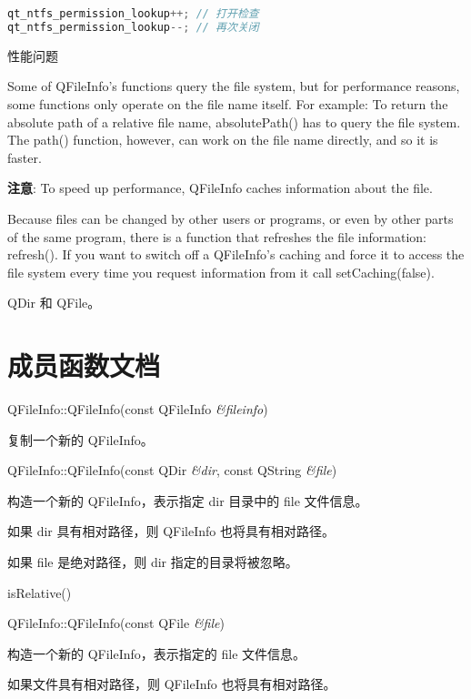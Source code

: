 \begin{lstlisting}[language=C++]
qt_ntfs_permission_lookup++; // 打开检查
qt_ntfs_permission_lookup--; // 再次关闭
\end{lstlisting}

性能问题

Some of QFileInfo's functions query the file system, but for performance reasons, some functions only operate on the file name itself. For example: To return the absolute path of a relative file name, absolutePath() has to query the file system. The path() function, however, can work on the file name directly, and so it is faster.

\textbf{注意}: To speed up performance, QFileInfo caches information about the file.

Because files can be changed by other users or programs, or even by other parts of the same program, there is a function that refreshes the file information: refresh(). If you want to switch off a QFileInfo's caching and force it to access the file system every time you request information from it call setCaching(false).


\begin{seeAlso}
QDir 和 QFile。
\end{seeAlso}

\splitLine 

\section{成员函数文档}

QFileInfo::QFileInfo(const QFileInfo \emph{\&fileinfo})

复制一个新的 QFileInfo。

QFileInfo::QFileInfo(const QDir \emph{\&dir}, const QString \emph{\&file})

构造一个新的 QFileInfo，表示指定 dir 目录中的 file 文件信息。

如果 dir 具有相对路径，则 QFileInfo 也将具有相对路径。

如果 file 是绝对路径，则 dir 指定的目录将被忽略。

\begin{seeAlso}
 isRelative()
\end{seeAlso}


QFileInfo::QFileInfo(const QFile \emph{\&file})

构造一个新的 QFileInfo，表示指定的 file 文件信息。

如果文件具有相对路径，则 QFileInfo 也将具有相对路径。

